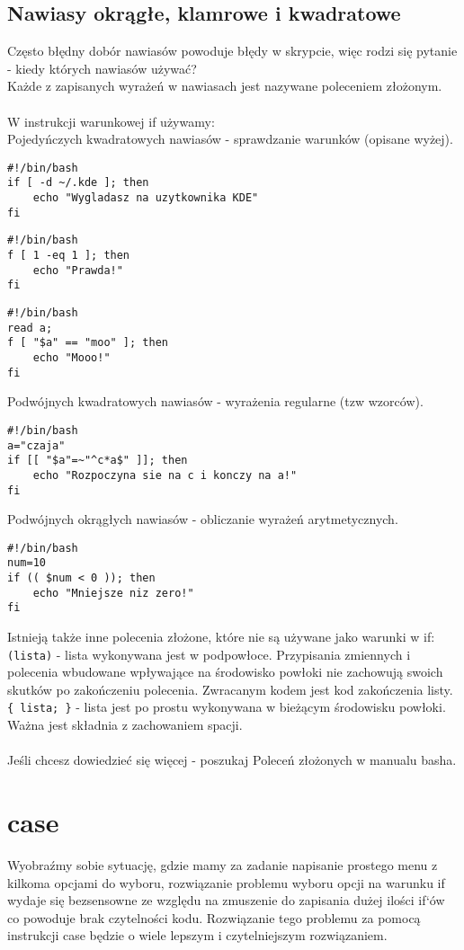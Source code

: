 \subsection{Nawiasy okrągłe, klamrowe i kwadratowe}
Często błędny dobór nawiasów powoduje błędy w skrypcie, więc rodzi się pytanie - kiedy których nawiasów używać?\\
Każde z zapisanych wyrażeń w nawiasach jest nazywane poleceniem złożonym.\\\\
W instrukcji warunkowej if używamy:\\
Pojedyńczych kwadratowych nawiasów - sprawdzanie warunków (opisane wyżej).
\begin{lstlisting}
#!/bin/bash
if [ -d ~/.kde ]; then
    echo "Wygladasz na uzytkownika KDE"
fi
\end{lstlisting}
\begin{lstlisting}
#!/bin/bash
f [ 1 -eq 1 ]; then
    echo "Prawda!" 
fi
\end{lstlisting}
\begin{lstlisting}
#!/bin/bash
read a;
f [ "$a" == "moo" ]; then
    echo "Mooo!" 
fi
\end{lstlisting}
Podwójnych kwadratowych nawiasów - wyrażenia regularne (tzw wzorców).
\begin{lstlisting}
#!/bin/bash
a="czaja"
if [[ "$a"=~"^c*a$" ]]; then
    echo "Rozpoczyna sie na c i konczy na a!"
fi
\end{lstlisting}
Podwójnych okrągłych nawiasów - obliczanie wyrażeń arytmetycznych.
\begin{lstlisting}
#!/bin/bash
num=10
if (( $num < 0 )); then
    echo "Mniejsze niz zero!"
fi 
\end{lstlisting}
Istnieją także inne polecenia złożone, które nie są używane jako warunki w if:\\
\texttt{(lista)} - lista wykonywana jest w podpowłoce. Przypisania zmiennych i  polecenia  wbudowane  wpływające na środowisko powłoki nie zachowują swoich skutków  po  zakończeniu  polecenia. Zwracanym kodem jest kod zakończenia listy.\\
\texttt{\{ lista; \}} - lista jest po prostu wykonywana w bieżącym środowisku powłoki. Ważna jest składnia z zachowaniem spacji.\\\\
Jeśli chcesz dowiedzieć się więcej - poszukaj Poleceń złożonych w manualu basha.

\section{case}
Wyobraźmy sobie sytuację, gdzie mamy za zadanie napisanie prostego menu z kilkoma
opcjami do wyboru, rozwiązanie problemu wyboru opcji na warunku if wydaje się
bezsensowne ze względu na zmuszenie do zapisania dużej ilości if`ów co powoduje brak
czytelności kodu. Rozwiązanie tego problemu za pomocą instrukcji case będzie o wiele
lepszym i czytelniejszym rozwiązaniem.

